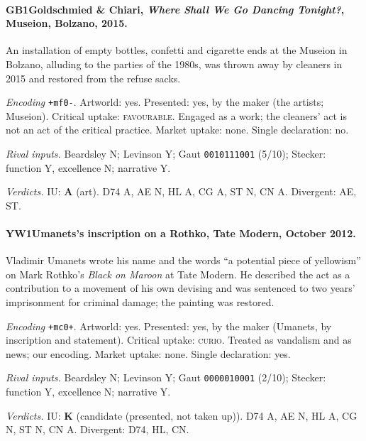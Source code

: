 \paragraph{GB1\enspace Goldschmied \& Chiari, \emph{Where Shall We Go Dancing Tonight?}, Museion, Bolzano, 2015.}
An installation of empty bottles, confetti and cigarette ends at the Museion in Bolzano, alluding to the parties of the 1980s, was thrown away by cleaners in 2015 and restored from the refuse sacks.\par
\noindent\textit{Encoding} \texttt{+mf0-}. Artworld: yes. Presented: yes, by the maker (the artists; Museion). Critical uptake: \textsc{favourable}. Engaged as a work; the cleaners' act is not an act of the critical practice. Market uptake: none. Single declaration: no.\par
\noindent\textit{Rival inputs.} Beardsley N; Levinson Y; Gaut \texttt{0010111001} (5/10); Stecker: function Y, excellence N; narrative Y.\par
\noindent\textit{Verdicts.} IU: \textbf{A} (art). D74 A, AE N, HL A, CG A, ST N, CN A. Divergent: AE, ST.\par

\paragraph{YW1\enspace Umanets's inscription on a Rothko, Tate Modern, October 2012.}
Vladimir Umanets wrote his name and the words \enquote{a potential piece of yellowism} on Mark Rothko's \emph{Black on Maroon} at Tate Modern. He described the act as a contribution to a movement of his own devising and was sentenced to two years' imprisonment for criminal damage; the painting was restored.\par
\noindent\textit{Encoding} \texttt{+mc0+}. Artworld: yes. Presented: yes, by the maker (Umanets, by inscription and statement). Critical uptake: \textsc{curio}. Treated as vandalism and as news; our encoding. Market uptake: none. Single declaration: yes.\par
\noindent\textit{Rival inputs.} Beardsley N; Levinson Y; Gaut \texttt{0000010001} (2/10); Stecker: function Y, excellence N; narrative Y.\par
\noindent\textit{Verdicts.} IU: \textbf{K} (candidate (presented, not taken up)). D74 A, AE N, HL A, CG N, ST N, CN A. Divergent: D74, HL, CN.\par


